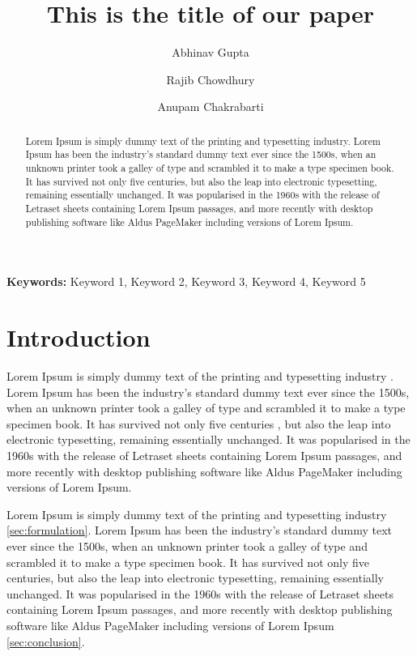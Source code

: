 \documentclass[10pt,a4paper, oneside]{article}
\theoremstyle{remark}
\providecommand{\keywords}[1]{\textbf{{Keywords:}} #1}
\begin{document}
	\title{This is the title of our paper}
	\author[1]{Abhinav Gupta}
	\author[1]{Rajib Chowdhury}
	\author[1]{Anupam Chakrabarti}

	\thispagestyle{empty}
	\newpage

	\maketitle
	\setcounter{page}{1}

	\begin{abstract}
		Lorem Ipsum is simply dummy text of the printing and typesetting industry. Lorem Ipsum has been the industry's standard dummy text ever since the 1500s, when an unknown printer took a galley of type and scrambled it to make a type specimen book. It has survived not only five centuries, but also the leap into electronic typesetting, remaining essentially unchanged. It was popularised in the 1960s with the release of Letraset sheets containing Lorem Ipsum passages, and more recently with desktop publishing software like Aldus PageMaker including versions of Lorem Ipsum.
	\end{abstract}
	\keywords{Keyword 1, Keyword 2, Keyword 3, Keyword 4, Keyword 5}
	\section{Introduction}
	Lorem Ipsum is simply dummy text of the printing and typesetting industry \citet{gupta55lineCodeLargescale2020}. Lorem Ipsum has been the industry's standard dummy text ever since the 1500s, when an unknown printer took a galley of type and scrambled it to make a type specimen book. It has survived not only five centuries \citep{guptaAutoadaptiveSubsteppingAlgorithm2020a,mandalLengthScaleInsensitive2020a}, but also the leap into electronic typesetting, remaining essentially unchanged. It was popularised in the 1960s with the release of Letraset sheets containing Lorem Ipsum passages, and more recently with desktop publishing software like Aldus PageMaker including versions of Lorem Ipsum.

	Lorem Ipsum is simply dummy text of the printing and typesetting industry \cref{sec:formulation}. Lorem Ipsum  has been the industry's standard dummy text ever since the 1500s, when an unknown printer took a galley of type and scrambled it to make a type specimen book. It has survived not only five centuries, but also the leap into electronic typesetting, remaining essentially unchanged. It was popularised in the 1960s with the release of Letraset sheets containing Lorem Ipsum passages, and more recently with desktop publishing software like Aldus PageMaker including versions of Lorem Ipsum \cref{sec:conclusion}.
\end{document}
